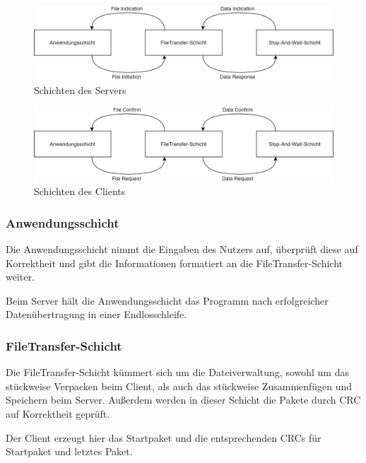 \documentclass{article}
\begin{document}
		\newpage

		\begin{figure}[!htb]
			\centering
			\includegraphics[scale=0.2]{schema_schichten_server.png}
			\caption{Schichten des Servers}
		\end{figure}

		\begin{figure}[!htb]
			\centering
			\includegraphics[scale=0.2]{schema_schichten_client.png}
			\caption{Schichten des Clients}
		\end{figure}

			\subsubsection{Anwendungsschicht}

			Die Anwendungsschicht nimmt die Eingaben des Nutzers auf, überprüft diese auf Korrektheit und gibt die Informationen formatiert an die FileTransfer-Schicht weiter.

			Beim Server hält die Anwendungsschicht das Programm nach erfolgreicher Datenübertragung in einer Endlosschleife.

			\subsubsection{FileTransfer-Schicht}

			Die FileTransfer-Schicht kümmert sich um die Dateiverwaltung, sowohl um das stückweise Verpacken beim Client, als auch das stückweise Zusammenfügen und Speichern beim Server. Außerdem werden in dieser Schicht die Pakete durch CRC auf Korrektheit geprüft.

			Der Client erzeugt hier das Startpaket und die entsprechenden CRCs für Startpaket und letztes Paket.
\end{document}
